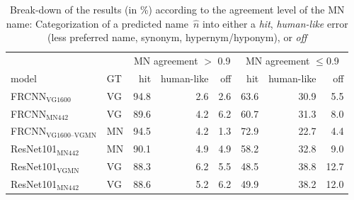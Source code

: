 \begin{table}[t]
\centering
	\small
\begin{tabular}{ll|rrr|rrr}
\toprule
&  & \multicolumn{3}{c|}{MN agreement $>$ 0.9} & \multicolumn{3}{c}{MN agreement $\leq$0.9}\\
                         model &  GT &  hit &  human-like &  off &  hit &  human-like &  off \\
\midrule
       FRCNN$_{\text{VG1600}}$ &  VG &   94.8 &           2.6 &      2.6 &   63.6 &          30.9 &      5.5 \\
        FRCNN$_{\text{MN442}}$ &  VG &   89.6 &           4.2 &      6.2 &   60.7 &          31.3 &      8.0 \\
        \midrule
 	FRCNN$_{\text{VG1600--VGMN}}$ &  MN &   94.5 &           4.2 &      1.3 &   72.9 &          22.7 &      4.4 \\
 \midrule
 ResNet101$_{\text{MN442}}$ &  MN &   90.1 &           4.9 &      4.9 &   58.2 &          32.8 &      9.0 \\
     ResNet101$_{\text{VGMN}}$ &  VG &   88.3 &           6.2 &      5.5 &   48.5 &          38.8 &     12.7 \\
    ResNet101$_{\text{MN442}}$ &  VG &   88.6 &           5.2 &      6.2 &   49.9 &          38.2 &     12.0 \\
\bottomrule
\end{tabular}
\caption{Break-down of the results (in \%) according to the agreement level of the MN name: Categorization of a predicted name\ $\hat{n}$ into either a \textit{hit}, \textit{human-like} error (less preferred name, synonym, hypernym/hyponym), or \textit{off} \label{tab:exp_errors_agreement}}
\end{table}
